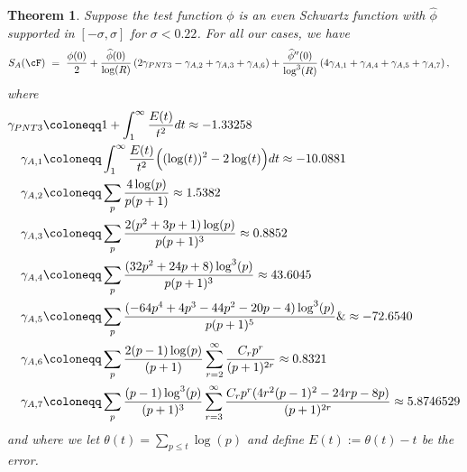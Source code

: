 \documentclass[11pt, reqno]{amsart}
\newtheorem{theorem}{Theorem}[section]
\theoremstyle{definition}
\theoremstyle{remark}
\numberwithin{equation}{section}
\renewcommand{\hat}{\widehat}
\begin{document}
\begin{theorem}\label{thm:SA} Suppose the test function $\phi$ is an even Schwartz function with $\hat\phi$ supported in $[-\sigma,\sigma]$ for $\sigma<0.22$. For all our cases, we have
       \begin{align}
         S_A(\cF) 
        &\ =\ \frac{\phi(0)}{2} + \frac{\hat\phi(0)}{\log(R)}\left(2\gamma_{PNT3} - \gamma_{A,2} + \gamma_{A,3} + \gamma_{A,6}\right) + \frac{\hat\phi''(0)}{\log^3(R)} \left(4\gamma_{A,1} + \gamma_{A,4} + \gamma_{A,5} + \gamma_{A,7}\right),
    \end{align}
    where 
    \footnotesize
    \begin{align}
        \gamma_{PNT3 } &\coloneqq 1+ \int_1^\infty \frac{E(t)}{t^2}dt \approx -1.33258\nonumber
       \\ \nonumber
       \gamma_{A,1} &\coloneqq \int_{1}^{\infty}\frac{E(t)}{t^{2}}\Bigl((\log(t))^{2}-2\log(t)\Bigr)dt \approx -10.0881\\\nonumber
        \gamma_{A,2} &\coloneqq \sum_p\frac{4\log(p)}{p(p+1)} \approx 1.5382\\\nonumber
        \gamma_{A,3} &\coloneqq \sum_p\frac{2(p^2+3p+1)\log(p)}{p(p+1)^3 }\approx 0.8852\\ \nonumber
        \gamma_{A,4} &\coloneqq \sum_p\frac{(32p^2+24p+8)\log^3(p)}{p(p+1)^3} \approx 43.6045 \\\nonumber
        \gamma_{A,5} &\coloneqq\sum_p\frac{(-64p^4+4p^3-44p^2-20p-4)\log^3(p)}{p(p+1)^5}\&\approx -72.6540\\ \nonumber
        \gamma_{A,6} &\coloneqq \sum_p\frac{2(p-1)\log(p)}{(p+1)}\sum_{r=2}^{\infty}\frac{C_rp^{r}}{(p+1)^{2r}}  \approx 0.8321\\ 
        \gamma_{A,7} &\coloneqq \sum_p\frac{(p-1)\log^3(p)}{(p+1)^3}\sum_{r=3}^{\infty}\frac{C_r p^{r}(4r^2(p-1)^2-24rp-8p)}{(p+1)^{2r}} \approx 5.8746529
        \end{align}\normalsize
    and where we let $\theta(t)=\sum_{p\leq t}\log(p)$ and define $E(t):=\theta(t)-t$ be the error.
\end{theorem}
\end{document}
